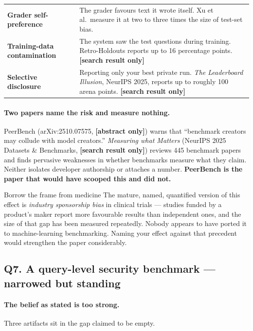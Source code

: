\documentclass[11pt,a4paper]{article}
\newcommand{\vstanding}{\textcolor{standing}{\textbf{narrowed but standing}}}
\newcommand{\abstag}{\textcolor{partial}{\textbf{[abstract only]}}}
\newcommand{\sniptag}{\textcolor{killed}{\textbf{[search result only]}}}
\begin{document}
\begin{center}
\begin{tabularx}{\textwidth}{@{}l>{\RaggedRight}X@{}}
\toprule
\textbf{Grader self-preference} & The grader favours text it wrote itself. Xu et al.\ measure it at two to three times the size of test-set bias. \\
\textbf{Training-data contamination} & The system saw the test questions during training. Retro-Holdouts reports up to 16 percentage points. \sniptag \\
\textbf{Selective disclosure} & Reporting only your best private run. \emph{The Leaderboard Illusion}, NeurIPS 2025, reports up to roughly 100 arena points. \sniptag \\
\bottomrule
\end{tabularx}
\end{center}

\paragraph{Two papers name the risk and measure nothing.} PeerBench
(arXiv:2510.07575, \abstag) warns that ``benchmark creators may collude with model
creators.'' \emph{Measuring what Matters} (NeurIPS 2025 Datasets \& Benchmarks,
\sniptag) reviews 445 benchmark papers and finds pervasive weaknesses in whether
benchmarks measure what they claim. Neither isolates developer authorship or
attaches a number. \textbf{PeerBench is the paper that would have scooped this and
did not.}

\begin{keybox}{Borrow the frame from medicine}
The mature, named, quantified version of this effect is \emph{industry sponsorship
bias} in clinical trials --- studies funded by a product's maker report more
favourable results than independent ones, and the size of that gap has been
measured repeatedly. Nobody appears to have ported it to machine-learning
benchmarking. Naming your effect against that precedent would strengthen the paper
considerably.
\end{keybox}

\subsection{Q7. A query-level security benchmark --- \texorpdfstring{\vstanding}{narrowed but standing}}

\paragraph{The belief as stated is too strong.} Three artifacts sit in the gap
claimed to be empty.
\end{document}
